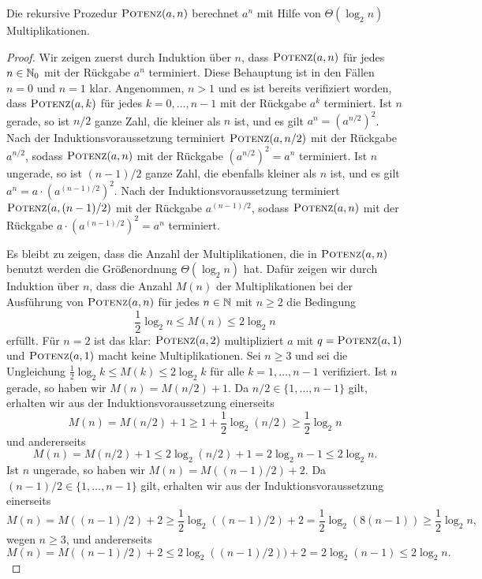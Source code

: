 \begin{prop}
	Die rekursive Prozedur $\mathop{\text{\textsc{Potenz}}}(a,n)$ berechnet $a^n$ mit Hilfe von $\Theta(\log_2 n)$ Multiplikationen.
\end{prop} 
\begin{proof} 
	Wir zeigen zuerst durch Induktion über $n$, dass $\mathop{\text{\textsc{Potenz}}}(a,n)$ für jedes $n \in \mathbb{N}_0$ mit der Rückgabe $a^n$ terminiert. 
	Diese Behauptung ist in den Fällen $n=0$ und $n=1$ klar. Angenommen, $n>1$ und es ist bereits verifiziert worden, dass $\mathop{\text{\textsc{Potenz}}}(a,k)$ für jedes $k=0,\ldots,n-1$ mit der Rückgabe $a^k$ terminiert. Ist $n$ gerade, so ist $n/2$ ganze Zahl, die kleiner als $n$ ist, und es gilt $a^n = (a^{n/2})^2$. Nach der Induktionsvoraussetzung terminiert $\mathop{\text{\textsc{Potenz}}}(a,n/2)$ mit der Rückgabe $a^{n/2}$, sodass $\mathop{\text{\textsc{Potenz}}}(a,n)$ mit der Rückgabe $(a^{n/2})^2 = a^n$ terminiert. Ist $n$ ungerade, so ist $(n-1)/2$ ganze Zahl, die ebenfalls kleiner als $n$ ist, und es gilt $a^n = a \cdot (a^{(n-1)/2})^2$. Nach der Induktionsvoraussetzung terminiert $\mathop{\text{\textsc{Potenz}}}(a,(n-1)/2)$ mit der Rückgabe $a^{(n-1)/2}$, sodass $\mathop{\text{\textsc{Potenz}}}(a,n)$ mit der Rückgabe $a \cdot (a^{(n-1)/2})^2 = a^n$ terminiert. 
	
	Es bleibt zu zeigen, dass die Anzahl der Multiplikationen, die in $\mathop{\text{\textsc{Potenz}}}(a,n)$ benutzt werden die Grö\ss enordnung $\Theta(\log_2 n)$ hat. Dafür zeigen wir durch Induktion über $n$, dass die Anzahl $M(n)$ der Multiplikationen bei der Ausführung von $\mathop{\text{\textsc{Potenz}}}(a,n)$ für jedes $n \in \mathbb{N}$ mit $n \ge 2$ 
	die Bedingung
	\[
			 \frac{1}{2} \log_2 n \le M(n) \le  2 \log_2 n
	\]
	erfüllt. Für $n=2$ ist das klar: $\mathop{\text{\textsc{Potenz}}}(a,2)$ multipliziert $a$ mit $q = \mathop{\text{\textsc{Potenz}}}(a,1)$ und $\mathop{\text{\textsc{Potenz}}}(a,1)$ macht keine Multiplikationen. Sei $n \ge 3$ und sei die Ungleichung $\frac12\log_2 k \le M(k) \le 2 \log_2 k$ für alle $k=1,\ldots,n-1$ verifiziert. Ist $n$ gerade, so haben wir $M(n) = M(n/2)+ 1$. Da $n/2 \in \{1,\ldots,n-1\}$ gilt, erhalten wir aus der Induktionsvoraussetzung einerseits
	\[
			M(n) = M(n/2) + 1 \ge 1 + \frac{1}{2} \log_2 (n/2) \geq \frac{1}{2} \log_2 n
	\]
	und andererseits 
	\[
		M(n) = M(n/2) + 1 \le 2 \log_2 (n/2) + 1 = 2 \log_2 n - 1 \le  2 \log_2 n. 
	\]
	Ist $n$ ungerade, so haben wir $M(n) = M((n-1)/2) + 2$. Da $(n-1)/2 \in \{1,\ldots,n-1\}$ gilt, erhalten wir aus der Induktionsvoraussetzung einerseits 
	\[
		M(n) = M((n-1)/2) + 2 \ge \frac{1}{2} \log_2 ((n-1)/2) + 2 = \frac{1}{2} \log_2 (8(n-1)) \ge \frac{1}{2} \log_2 n,
	\]
	wegen $n \geq 3$, und andererseits 
	\[
		M(n) = M((n-1)/2)+2 \le 2 \log_2 ((n-1)/2)) + 2  = 2 \log_2 (n-1) \le 2 \log_2 n. 
	\]
\end{proof} 



